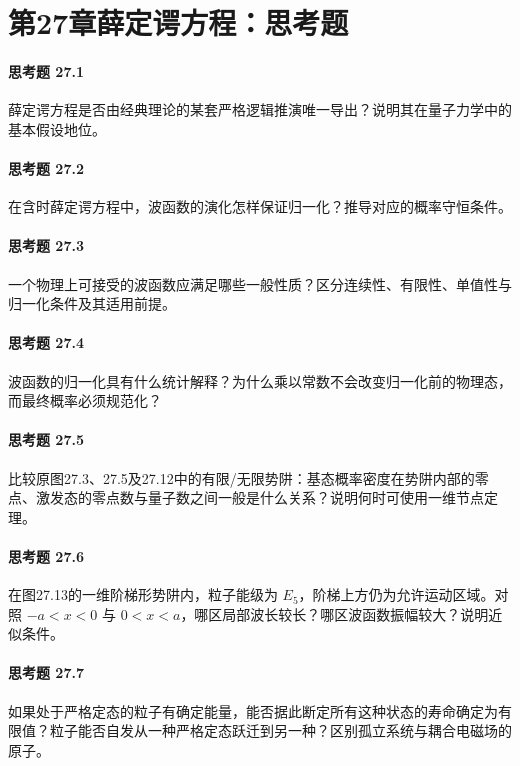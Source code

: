 \section*{第27章\quad 薛定谔方程：思考题}
\paragraph{思考题 27.1}
薛定谔方程是否由经典理论的某套严格逻辑推演唯一导出？说明其在量子力学中的基本假设地位。
\paragraph{思考题 27.2}
在含时薛定谔方程中，波函数的演化怎样保证归一化？推导对应的概率守恒条件。
\paragraph{思考题 27.3}
一个物理上可接受的波函数应满足哪些一般性质？区分连续性、有限性、单值性与归一化条件及其适用前提。
\paragraph{思考题 27.4}
波函数的归一化具有什么统计解释？为什么乘以常数不会改变归一化前的物理态，而最终概率必须规范化？
\paragraph{思考题 27.5}
比较原图27.3、27.5及27.12中的有限/无限势阱：基态概率密度在势阱内部的零点、激发态的零点数与量子数之间一般是什么关系？说明何时可使用一维节点定理。
\paragraph{思考题 27.6}
在图27.13的一维阶梯形势阱内，粒子能级为 \(E_5\)，阶梯上方仍为允许运动区域。对照 \(-a<x<0\) 与 \(0<x<a\)，哪区局部波长较长？哪区波函数振幅较大？说明近似条件。
\paragraph{思考题 27.7}
如果处于严格定态的粒子有确定能量，能否据此断定所有这种状态的寿命确定为有限值？粒子能否自发从一种严格定态跃迁到另一种？区别孤立系统与耦合电磁场的原子。
